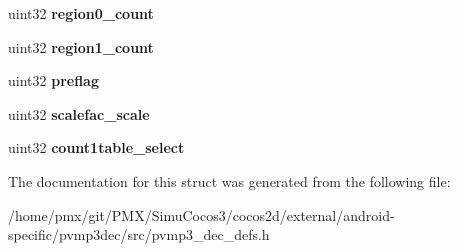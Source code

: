 \begin{DoxyCompactItemize}
\mbox{\label{structgranuleInfo_ae3345ce346f1df112fee56e032a67f35}} 
uint32 {\bfseries region0\+\_\+count}
\item 
\mbox{\label{structgranuleInfo_a3f28ffd50e75130fc9fc11843af594eb}} 
uint32 {\bfseries region1\+\_\+count}
\item 
\mbox{\label{structgranuleInfo_ad367e1e7e6d954c5c736ca6e0542a874}} 
uint32 {\bfseries preflag}
\item 
\mbox{\label{structgranuleInfo_a9701bd1683f465eb682ad4d388f02734}} 
uint32 {\bfseries scalefac\+\_\+scale}
\item 
\mbox{\label{structgranuleInfo_a2bbac457dc467d736994a38e75261ec9}} 
uint32 {\bfseries count1table\+\_\+select}
\end{DoxyCompactItemize}


The documentation for this struct was generated from the following file\+:\begin{DoxyCompactItemize}
\item 
/home/pmx/git/\+P\+M\+X/\+Simu\+Cocos3/cocos2d/external/android-\/specific/pvmp3dec/src/pvmp3\+\_\+dec\+\_\+defs.\+h\end{DoxyCompactItemize}
